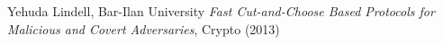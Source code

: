 %



\begin{thebibliography}{99}

 Yehuda Lindell, Bar-Ilan University \emph{Fast Cut-and-Choose Based Protocols for Malicious and Covert Adversaries}, {Crypto} (2013)

\end{thebibliography}

%
